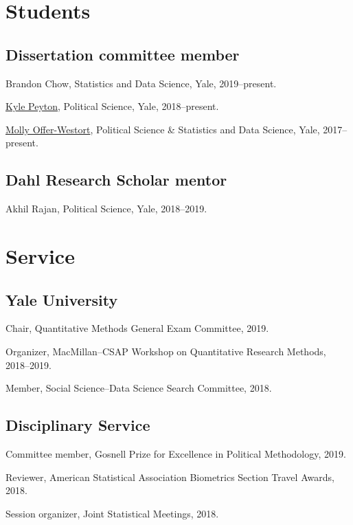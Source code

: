 \documentclass[10pt,letterpaper]{article}
\newenvironment{infolist}{
	\begin{list}{}{
		\setlength{\parskip}{0pt}
		\setlength{\itemsep}{4pt}
		\setlength{\parsep}{0.3em}
		\setlength{\leftmargin}{0em}
		\setlength{\labelwidth}{0em}
		}
	}{
\end{list}
}
\newcommand{\infoitem}[1]{\item {#1}}
\begin{document}
	\section*{Students}

	\subsection*{Dissertation committee member}

	\begin{infolist}
		\infoitem{Brandon Chow, Statistics and Data Science, Yale, 2019--present.}
		\infoitem{\href{https://kylepeyton.github.io}{Kyle Peyton}, Political Science, Yale, 2018--present.}
		\infoitem{\href{https://mollyow.github.io}{Molly Offer-Westort}, Political Science \& Statistics and Data Science, Yale, 2017--present.}
	\end{infolist}

	\subsection*{Dahl Research Scholar mentor}

	\begin{infolist}
		\infoitem{Akhil Rajan, Political Science, Yale, 2018--2019.}
	\end{infolist}


	\section*{Service}

	\subsection*{Yale University}

	\begin{infolist}
		\infoitem{Chair, Quantitative Methods General Exam Committee, 2019.}
		\infoitem{Organizer, MacMillan--CSAP Workshop on Quantitative Research Methods, 2018--2019.}
		\infoitem{Member, Social Science--Data Science Search Committee, 2018.}
	\end{infolist}

	\subsection*{Disciplinary Service}

	\begin{infolist}
		\infoitem{Committee member, Gosnell Prize for Excellence in Political Methodology, 2019.}
		\infoitem{Reviewer, American Statistical Association Biometrics Section Travel Awards, 2018.}
		\infoitem{Session organizer, Joint Statistical Meetings, 2018.}
	\end{infolist}
\end{document}
